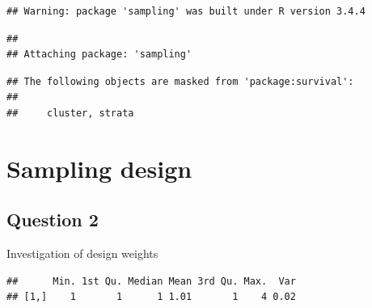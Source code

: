 \documentclass[]{article}
\newenvironment{Shaded}{\begin{snugshade}}{\end{snugshade}}
\newcommand{\KeywordTok}[1]{\textcolor[rgb]{0.13,0.29,0.53}{\textbf{{#1}}}}
\newcommand{\DecValTok}[1]{\textcolor[rgb]{0.00,0.00,0.81}{{#1}}}
\newcommand{\StringTok}[1]{\textcolor[rgb]{0.31,0.60,0.02}{{#1}}}
\newcommand{\CommentTok}[1]{\textcolor[rgb]{0.56,0.35,0.01}{\textit{{#1}}}}
\newcommand{\NormalTok}[1]{{#1}}
\begin{document}
\begin{verbatim}
## Warning: package 'sampling' was built under R version 3.4.4
\end{verbatim}

\begin{verbatim}
## 
## Attaching package: 'sampling'
\end{verbatim}

\begin{verbatim}
## The following objects are masked from 'package:survival':
## 
##     cluster, strata
\end{verbatim}

\begin{Shaded}
\end{Shaded}

\section{Sampling design}\label{sampling-design}

\subsection{Question 2}\label{question-2}

Investigation of design weights

\begin{Shaded}
\end{Shaded}

\begin{verbatim}
##      Min. 1st Qu. Median Mean 3rd Qu. Max.  Var
## [1,]    1       1      1 1.01       1    4 0.02
\end{verbatim}
\end{document}
